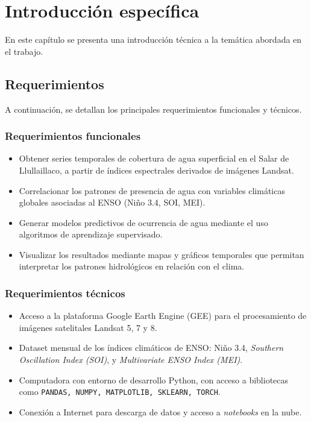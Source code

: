 \chapter{Introducción específica} %

\label{Chapter2}

En este capítulo se presenta una introducción técnica a la temática abordada en el trabajo. 

\section{Requerimientos}
\label{sec:ejemplo}
A continuación, se detallan los principales requerimientos funcionales y técnicos.

\subsection*{Requerimientos funcionales}

\begin{itemize}
\item Obtener series temporales de cobertura de agua superficial en el Salar de Llullaillaco, a partir de índices espectrales derivados de imágenes Landsat.
\item Correlacionar los patrones de presencia de agua con variables climáticas globales asociadas al ENSO (Niño 3.4, SOI, MEI).
\item Generar modelos predictivos de ocurrencia de agua mediante el uso algoritmos de aprendizaje supervisado.
\item Visualizar los resultados mediante mapas y gráficos temporales que permitan interpretar los patrones hidrológicos en relación con el clima.
\end{itemize}

\subsection*{Requerimientos técnicos}

\begin{itemize}
\item Acceso a la plataforma Google Earth Engine (GEE) para el procesamiento de imágenes satelitales Landsat 5, 7 y 8.
\item Dataset mensual de los índices climáticos de ENSO: Niño 3.4, \textit{Southern Oscillation Index (SOI)}, y \textit{Multivariate ENSO Index (MEI)}.
\item Computadora con entorno de desarrollo Python, con acceso a bibliotecas como \texttt{PANDAS, NUMPY, MATPLOTLIB, SKLEARN, TORCH}.
\item Conexión a Internet para descarga de datos y acceso a \textit{notebooks} en la nube.
\end{itemize}



